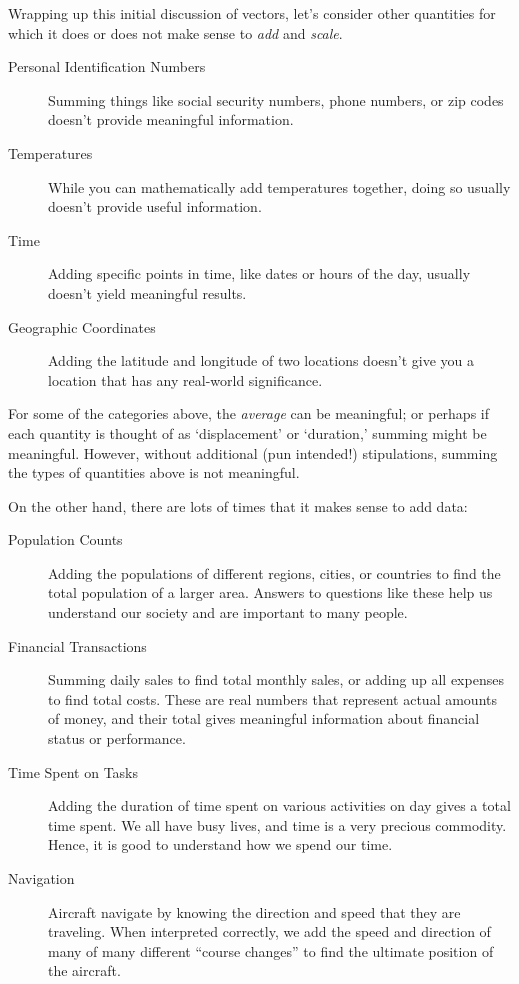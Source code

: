 \documentclass{ximera}
\begin{document}
\begin{exploration}

  Wrapping up this initial discussion of vectors, let's consider other quantities for which it does or does not make sense to \emph{add} and \emph{scale}.

  \begin{example}

\begin{description}
\item[Personal Identification Numbers] Summing things like social
  security numbers, phone numbers, or zip codes doesn't provide
  meaningful information.
\item[Temperatures] While you can mathematically add temperatures
  together, doing so usually doesn't provide useful information.
\item[Time] Adding specific points in time, like dates or hours of the
  day, usually doesn't yield meaningful results.
\item[Geographic Coordinates] Adding the latitude and longitude of two
  locations doesn't give you a location that has any real-world
  significance.
\end{description}
\end{example}

For some of the categories above, the \textit{average} can be
meaningful; or perhaps if each quantity is thought of as
`displacement' or `duration,' summing might be meaningful. However,
without additional (pun intended!) stipulations, summing the types of
quantities above is not meaningful.

\begin{example}

On the other hand, there are lots of
times that it makes sense to add data:


\begin{description}
\item[Population Counts] Adding the populations of different regions,
  cities, or countries to find the total population of a larger
  area. Answers to questions like these help us understand our
  society and are important to many people.
\item[Financial Transactions] Summing daily sales to find total
  monthly sales, or adding up all expenses to find total costs. These
  are real numbers that represent actual amounts of money, and their
  total gives meaningful information about financial status or
  performance.
\item[Time Spent on Tasks] Adding the duration of time spent on
  various activities on day gives a total time spent. We all have busy
  lives, and time is a very precious commodity. Hence, it is good to
  understand how we spend our time.
\item[Navigation] Aircraft navigate by knowing the direction and speed
  that they are traveling. When interpreted correctly, we add the
  speed and direction of many of many different ``course changes'' to
  find the ultimate position of the aircraft.
\end{description}


\end{example}
\end{exploration}
\end{document}
